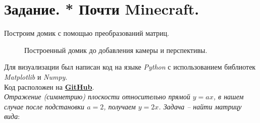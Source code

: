 \documentclass[a5paper, 10pt]{article}
\theoremstyle{definition}
\theoremstyle{plain}
\theoremstyle{remark}
\begin{document}
\newpage
\section{Задание. * Почти Minecraft.}

Построим домик с помощью преобразований матриц.
\begin{figure}[h!]
\caption{Построенный домик до добавления камеры и перспективы.}
\end{figure}





Для визуализации был написан код на языке \textit{Python} с использованием библиотек \textit{Matplotlib} и \textit{Numpy}. \\
Код расположен на \href{https://github.com/a-nechaeva/practical_Linal/tree/main/lab2/py_code}{\textbf{GitHub}}.
\\
\textit{Отражение (симметрию) плоскости относительно прямой $y=ax$, в нашем случае после подстановки $a=2$, получаем $y=2x$. Задача -- найти матрицу вида}:
\end{document}
